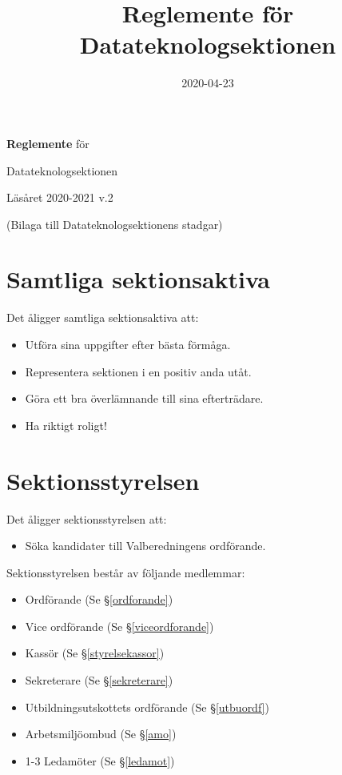 \documentclass{datateknologsektionen-document}
\title{Reglemente för Datateknologsektionen}
\date{2020-04-23}
\begin{document}
\hspace{0pt}
\vfill
\begin{center}

  \Huge{
    \textbf{Reglemente} för

    Datateknologsektionen

    Läsåret 2020-2021 v.2
  }

  \vspace{30pt}

  \Large{(Bilaga till Datateknologsektionens stadgar)}

\end{center}
\vfill
\hspace{0pt}

\pagebreak

\tableofcontents

\pagebreak

\section{Samtliga sektionsaktiva}
Det åligger samtliga sektionsaktiva att:
\begin{itemize}
  \item Utföra sina uppgifter efter bästa förmåga.
  \item Representera sektionen i en positiv anda utåt.
  \item Göra ett bra överlämnande till sina efterträdare.
  \item Ha riktigt roligt!
\end{itemize}

\section{Sektionsstyrelsen}
Det åligger sektionsstyrelsen att:
\begin{itemize}
  \item Söka kandidater till Valberedningens ordförande.
\end{itemize}
Sektionsstyrelsen består av följande medlemmar:
\begin{itemize}
  \item Ordförande (Se \S \ref{ordforande})
  \item Vice ordförande (Se \S \ref{viceordforande})
  \item Kassör (Se \S \ref{styrelsekassor})
  \item Sekreterare (Se \S \ref{sekreterare})
  \item Utbildningsutskottets ordförande (Se \S \ref{utbuordf})
  \item Arbetsmiljöombud (Se \S \ref{amo})
  \item 1-3 Ledamöter (Se \S \ref{ledamot})
\end{itemize}
\end{document}
